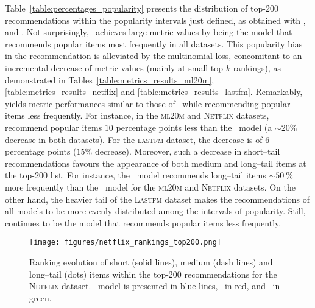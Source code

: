 Table~\ref{table:percentages_popularity} presents the distribution of top-200 recommendations within the  popularity intervals just defined, as obtained with \CEpointlinsig, \MULTItanhlin\, and \MILlinsig. 
Not surprisingly, \CEpointlinsig\, achieves large metric values by being the model that recommends popular items most frequently in all datasets. 
This popularity bias in the recommendation is alleviated by the multinomial loss, concomitant to an incremental decrease of metric values (mainly at small top-$k$ rankings), as demonstrated in Tables~\ref{table:metrics_results_ml20m}, \ref{table:metrics_results_netflix} and \ref{table:metrics_results_lastfm}. 
Remarkably, \MILlinsig\, yields metric performances similar to those of \CEpointlinsig\,  while recommending popular items less frequently. For instance, in the \textsc{ml20m} and \textsc{Netflix} datasets, \MILlinsig\, recommend popular items $10$ percentage points less than the \CEpointlinsig\, model (a $\sim20 \%$ decrease in both datasets). For the \textsc{lastfm} dataset, the decrease is of $6$ percentage points ($15 \%$ decrease). Moreover, such a  decrease in short--tail recommendations  favours the appearance of both medium and long--tail items at the top-200 list. For instance, the \MILlinsig\, model recommends long--tail items $\sim50~\%$ more frequently than the \CEpointlinsig\, model for the \textsc{ml20m} and \textsc{Netflix} datasets. 
On the other hand, the heavier tail of the \textsc{Lastfm} dataset makes the recommendations of all models to be more evenly distributed among the intervals of popularity. Still, \MILlinsig\, continues to be the model that recommends popular items less frequently. 

\begin{figure}
\begin{center}
    \texttt{[image: figures/netflix\_rankings\_top200.png]}
    \caption{Ranking evolution of short (solid lines), medium (dash lines) and long--tail (dots) items within the top-200 recommendations for the \textsc{Netflix} dataset.
    \MILlinsig\, model is presented in blue lines, \CEpointlinsig\, in red, and \MULTItanhlin\, in green.}
    \label{fig:rankings_tails_netflix}
\end{center}
\end{figure}


